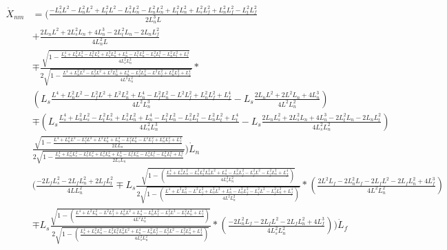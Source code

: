 \documentclass[11pt, landscape]{article}
\begin{document}
\begin{align}
  \dot{X}_{nm} &= \Bigg(\frac{-L_s^2L^2 - L_n^2L^2 + L_t^2L^2 - L_s^2L_{n}^2 - L_n^2L_{n}^2 + L_t^2L_{n}^2 + L_s^2L_{f}^2 + L_n^2L_{f}^2 - L_t^2L_{f}^2}{{2L_n^{3}L}}\\
  &+ \frac{2L_nL^2 + 2L_s^2L_{n} + 4L_n^3 - 2L_t^2L_{n} - 2L_nL_{f}^2}{4L_n^2L}\\
  &\mp \frac{\sqrt{1-\frac{L_{s}^4 + L_n^2L_{s}^2 - L_t^2L_{s}^2 + L_s^2L_{n}^2 + L_{n}^4 - L_t^2L_{n}^2 - L_s^2L_{t}^2 - L_n^2L_{t}^2 + L_{t}^4}{4L_{s}^2L_{n}^2}}}{2\sqrt{1-\frac{L^4 + L_n^2L^2 - L_f^2L^2 + L^2L_{n}^2 + L_{n}^4 - L_f^2L_{n}^2 - L^2L_{f}^2 + L_n^2L_{f}^2 + L_{f}^4}{4L^2L_{n}^2}}}*\\
  &\left(L_s\frac{L^4 + L_n^2L^2 - L_f^2L^2 + L^2L_{n}^2 + L_{n}^4 - L_f^2L_{n}^2 - L^2L_{f}^2 + L_n^2L_{f}^2 + L_{f}^4}{4L^2L^3_{n}} - L_s\frac{2L_nL^2 + 2L^2L_{n} + 4L_{n}^3}{4L^2L_{n}^2}\right)\\
  &\mp \left(L_s\frac{L_{s}^4 + L_n^2L_{s}^2 - L_t^2L_{s}^2 + L_s^2L_{n}^2 + L_{n}^4 - L_t^2L_{n}^2 - L_s^2L_{t}^2 - L_n^2L_{t}^2 + L_{t}^4}{4L_{s}^2L^3_{n}}
    - L_s\frac{2L_nL_{s}^2 + 2L_s^2L_{n} + 4L_{n}^3 - 2L_t^2L_{n} - 2L_nL_{t}^2}{4L_{s}^2L_{n}^2}\right)\\
  &\frac{\sqrt{1-\frac{L^4 + L_n^2L^2 - L_f^2L^2 + L^2L_{n}^2 + L_{n}^4 - L_f^2L_{n}^2 - L^2L_{f}^2 + L_n^2L_{f}^2 + L_{f}^4}{2LL_{n}}}}{2\sqrt{1-\frac{L_{s}^4 + L_n^2L_{s}^2 - L_t^2L_{s}^2 + L_s^2L_{n}^2 + L_{n}^4 - L_t^2L_{n}^2 - L_s^2L_{t}^2 - L_n^2L_{t}^2 + L_{t}^4}{2L_{s}L_{n}}}}\Bigg)\dot{L}_n\\
  &\Bigg(\frac{-2L_fL_s^2 - 2L_fL_n^2 + 2L_fL_t^2}{4LL_{n}^2}
  \mp L_s\frac{\sqrt{1-\left(\frac{L_s^4 + L_s^2L_n^2 - L_s^2L_t^2 L_n^2L^2 + L_n^4 - L_n^2L_f^2 - L_f^2L^2 - L_f^2L_n^2 + L_f^4}{4L_{s}^2L_{n}^2}\right)}}{2\sqrt{1 - \left(\frac{L^4 + L^2L_n^2 - L^2L_f^2 + L_n^2L^2 + L_n^4 - L_n^2L_f^2 - L_f^2L^2 - L_f^2L_n^2 + L_f^4}{4L^2L_{n}^2}\right)}}
  *\left(\frac{2L^2L_f - 2L_n^2L_f - 2L_fL^2 - 2L_fL_n^2 + 4L_f^3}{4L^2L_{n}^2}\right)\\
  &\mp L_s\frac{\sqrt{1 - \left(\frac{L^4 + L^2L_n^2 - L^2L_f^2 + L_n^2L^2 + L_n^4 - L_n^2L_f^2 - L_f^2L^2 - L_f^2L_n^2 + L_f^4}{4L^2L_{n}^2}\right)}}{2\sqrt{1-\left(\frac{L_s^4 + L_s^2L_n^2 - L_s^2L_t^2 L_n^2L^2 + L_n^4 - L_n^2L_f^2 - L_f^2L^2 - L_f^2L_n^2 + L_f^4}{4L_{s}^2L_{n}^2}\right)}}
  *\left(\frac{-2L_n^2L_f - 2L_fL^2 - 2L_fL_n^2 + 4L_f^3}{4L_{s}^2L_{n}^2}\right)\Bigg)\dot{L}_f\\
\end{align}
\end{document}
